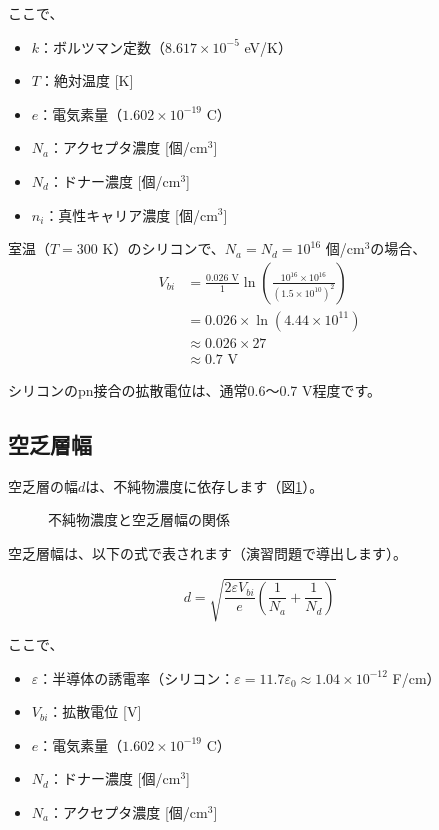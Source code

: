 ここで、
\begin{itemize}
\item $k$：ボルツマン定数（$8.617 \times 10^{-5}$ eV/K）
\item $T$：絶対温度 [K]
\item $e$：電気素量（$1.602 \times 10^{-19}$ C）
\item $N_a$：アクセプタ濃度 [個/cm$^3$]
\item $N_d$：ドナー濃度 [個/cm$^3$]
\item $n_i$：真性キャリア濃度 [個/cm$^3$]
\end{itemize}

室温（$T = 300$ K）のシリコンで、$N_a = N_d = 10^{16}$ 個/cm$^3$の場合、
\begin{align}
V_{bi} &= \frac{0.026 \text{ V}}{1} \ln\left(\frac{10^{16} \times 10^{16}}{(1.5 \times 10^{10})^2}\right) \\
&= 0.026 \times \ln(4.44 \times 10^{11}) \\
&\approx 0.026 \times 27 \\
&\approx 0.7 \text{ V}
\end{align}

シリコンのpn接合の拡散電位は、通常0.6〜0.7 V程度です。

\subsection{空乏層幅}

空乏層の幅$d$は、不純物濃度に依存します（図\ref{fig:depletion_width}）。

\begin{figure}[H]
\centering
{}
\caption{不純物濃度と空乏層幅の関係}
\label{fig:depletion_width}
\end{figure}

空乏層幅は、以下の式で表されます（演習問題で導出します）。

\begin{equation}
d = \sqrt{\frac{2\varepsilon V_{bi}}{e}\left(\frac{1}{N_a} + \frac{1}{N_d}\right)}
\end{equation}

ここで、
\begin{itemize}
\item $\varepsilon$：半導体の誘電率（シリコン：$\varepsilon = 11.7 \varepsilon_0 \approx 1.04 \times 10^{-12}$ F/cm）
\item $V_{bi}$：拡散電位 [V]
\item $e$：電気素量（$1.602 \times 10^{-19}$ C）
\item $N_d$：ドナー濃度 [個/cm$^3$]
\item $N_a$：アクセプタ濃度 [個/cm$^3$]
\end{itemize}

